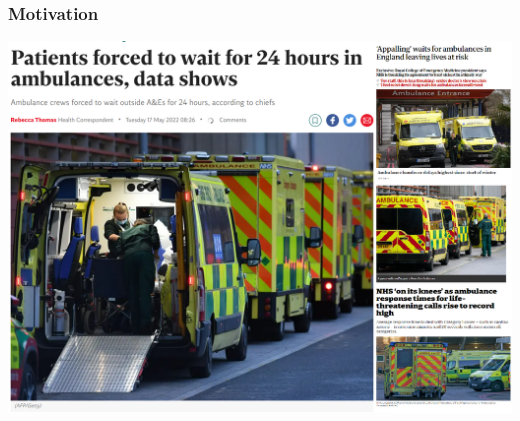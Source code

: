\begin{frame}
    \frametitle{Motivation}
    \centering

    \includegraphics[scale=0.3]{Bin/articles.png}
        
\end{frame}